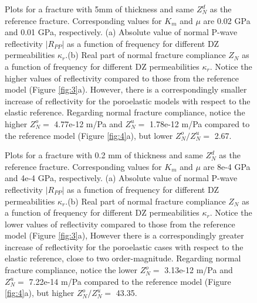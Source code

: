 \documentclass[draft,jgrga]{agutexSI2019}
\begin{document}
\begin{figure}[hp]
\centering
\caption {Plots for a fracture with 5mm of thickness and same $Z_N^d$ as the reference fracture. Corresponding values for $K_m$ and $\mu$ are 0.02 GPa and 0.01 GPa, respectively. (a) Absolute value of normal P-wave reflectivity $|R_{PP}|$ as a function of frequency for different DZ permeabilities $\kappa_r$.(b) Real part of normal fracture compliance $Z_N$ as a function of frequency for different DZ permeabilities $\kappa_r$. Notice the higher values of reflectivity compared to those from the reference model (Figure \ref{fig:3}a). However, there is a correspondingly smaller increase of reflectivity for the poroelastic models with respect to the elastic reference. Regarding normal fracture compliance, notice the higher $Z_N^o =$ 4.77e-12 m/Pa and $Z_N^u =$ 1.78e-12 m/Pa compared to the reference model (Figure \ref{fig:4}a), but lower $Z_N^o/Z_N^u= $ 2.67.
}
\label{fig:6}
\end{figure}


\begin{figure}[hp]
\centering
\caption {Plots for a fracture with 0.2 mm of thickness and same $Z_N^d$ as the reference fracture. Corresponding values for $K_m$ and $\mu$ are 8e-4 GPa and 4e-4 GPa, respectively. (a) Absolute value of normal P-wave reflectivity $|R_{PP}|$ as a function of frequency for different DZ permeabilities $\kappa_r$.(b) Real part of normal fracture compliance $Z_N$ as a function of frequency for different DZ permeabilities $\kappa_r$. Notice the lower values of reflectivity compared to those from the reference model (Figure \ref{fig:3}a), However there is  a correspondingly greater increase of reflectivity for the poroelastic cases with respect to the elastic reference, close to two order-magnitude. Regarding normal fracture compliance, notice the lower $Z_N^o =$ 3.13e-12 m/Pa and $Z_N^u =$ 7.22e-14 m/Pa compared to the reference model (Figure \ref{fig:4}a), but higher $Z_N^o/Z_N^u= $ 43.35.}
\label{fig:7}
\end{figure}
\end{document}
